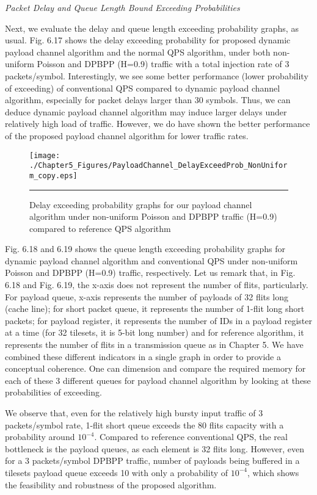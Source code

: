 \textit{Packet Delay and Queue Length Bound Exceeding Probabilities}


Next, we evaluate the delay and queue length exceeding probability graphs, as usual. Fig. 6.17 shows the delay exceeding probability for proposed dynamic payload channel algorithm and the normal QPS algorithm, under both non-uniform Poisson and DPBPP (H=0.9) traffic with a total injection rate of 3 packets/symbol. Interestingly, we see some better performance (lower probability of exceeding) of conventional QPS compared to dynamic payload channel algorithm, especially for packet delays larger than 30 symbols. Thus, we can deduce dynamic payload channel algorithm may induce larger delays under relatively high load of traffic. However, we do have shown the better performance of the proposed payload channel algorithm for lower traffic rates.   

\begin{figure}[htbp]
  \centering
    \texttt{[image: ./Chapter5\_Figures/PayloadChannel\_DelayExceedProb\_NonUniform\_copy.eps]}
    \rule{35em}{0.5pt}
  \caption[Delay exceeding probability graphs for our dynamic payload channel algorithm under uniform DPBPP traffic]{Delay exceeding probability graphs for our payload channel algorithm under non-uniform Poisson and DPBPP traffic (H=0.9) compared to reference QPS algorithm}
  \label{fig:Electron}
\end{figure}

Fig. 6.18 and 6.19 shows the queue length exceeding probability graphs for dynamic payload channel algorithm and conventional QPS under non-uniform Poisson and DPBPP (H=0.9) traffic, respectively. Let us remark that, in Fig. 6.18 and Fig. 6.19, the x-axis does not represent the number of flits, particularly. For payload queue, x-axis represents the number of payloads of 32 flits long (cache line); for short packet queue, it represents the number of 1-flit long short packets; for payload register, it represents the number of IDs in a payload register at a time (for 32 tilesets, it is 5-bit long number) and for reference algorithm, it represents the number of flits in a transmission queue as in Chapter 5. We have combined these different indicators in a single graph in order to provide a conceptual coherence. One can dimension and compare the required memory for each of these 3 different queues for payload channel algorithm by looking at these probabilities of exceeding.        

We observe that, even for the relatively high bursty input traffic of 3 packets/symbol rate, 1-flit short queue exceeds the 80 flits capacity with a probability around $10^{-4}$. Compared to reference conventional QPS, the real bottleneck is the payload queues, as each element is 32 flits long. However, even for a 3 packets/symbol DPBPP traffic, number of payloads being buffered in a tilesets payload queue exceeds 10 with only a probability of $10^{-4}$, which shows the feasibility and robustness of the proposed algorithm.   

